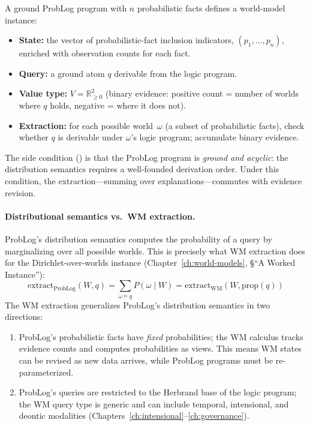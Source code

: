\begin{definition}
\label{def:problog-wm}
A ground ProbLog program with $n$ probabilistic facts defines a
world-model instance:
\begin{itemize}
\item \textbf{State:} the vector of probabilistic-fact inclusion
  indicators, $(p_1, \ldots, p_n)$, enriched with observation counts
  for each fact.
\item \textbf{Query:} a ground atom $q$ derivable from the logic
  program.
\item \textbf{Value type:} $V = \mathbb{R}_{\ge 0}^2$ (binary evidence:
  positive count = number of worlds where $q$ holds, negative = where
  it does not).
\item \textbf{Extraction:} for each possible world~$\omega$
  (a subset of probabilistic facts), check whether $q$ is derivable
  under $\omega$'s logic program; accumulate binary evidence.
\end{itemize}
\end{definition}

\noindent
The side condition (\claimConditional{}) is that the ProbLog program is
\emph{ground and acyclic}: the distribution semantics requires a
well-founded derivation order.  Under this condition, the
extraction---summing over explanations---commutes with evidence
revision.

\paragraph{Distributional semantics vs.\ WM extraction.}
ProbLog's distribution semantics computes the probability of a query by
marginalizing over all possible worlds.  This is precisely what WM
extraction does for the Dirichlet-over-worlds instance
(Chapter~\ref{ch:world-models}, \S``A Worked Instance''):
\[
  \mathrm{extract}_{\mathrm{ProbLog}}(W, q) =
  \sum_{\omega \models q} P(\omega \mid W)
  = \mathrm{extract}_{\mathrm{WM}}(W, \mathrm{prop}(q))
\]
The WM extraction generalizes ProbLog's distribution semantics in two
directions:
\begin{enumerate}
\item ProbLog's probabilistic facts have \emph{fixed} probabilities;
  the WM calculus tracks evidence counts and computes probabilities as
  views.  This means WM states can be revised as new data arrives,
  while ProbLog programs must be re-parameterized.
\item ProbLog's queries are restricted to the Herbrand base of the
  logic program; the WM query type is generic and can include
  temporal, intensional, and deontic modalities
  (Chapters~\ref{ch:intensional}--\ref{ch:governance}).
\end{enumerate}

